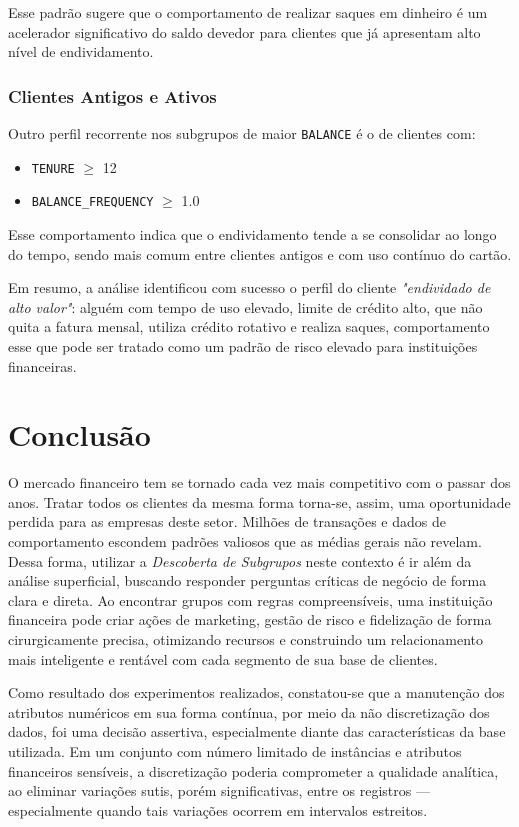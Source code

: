 \documentclass[12pt]{article}
\begin{document}
Esse padrão sugere que o comportamento de realizar saques em dinheiro é um acelerador significativo do saldo devedor para clientes que já apresentam alto nível de endividamento.

\subsubsection{Clientes Antigos e Ativos}

Outro perfil recorrente nos subgrupos de maior \texttt{BALANCE} é o de clientes com:
\begin{itemize}
    \item \texttt{TENURE} $\geq$ 12
    \item \texttt{BALANCE\_FREQUENCY} $\geq$ 1.0
\end{itemize}

Esse comportamento indica que o endividamento tende a se consolidar ao longo do tempo, sendo mais comum entre clientes antigos e com uso contínuo do cartão.

Em resumo, a análise identificou com sucesso o perfil do cliente \textit{"endividado de alto valor"}: alguém com tempo de uso elevado, limite de crédito alto, que não quita a fatura mensal, utiliza crédito rotativo e realiza saques, comportamento esse que pode ser tratado como um padrão de risco elevado para instituições financeiras.

\section{Conclusão}

O mercado financeiro tem se tornado cada vez mais competitivo com o passar dos anos. Tratar todos os clientes da mesma forma torna-se, assim, uma oportunidade perdida para as empresas deste setor. Milhões de transações e dados de comportamento escondem padrões valiosos que as médias gerais não revelam. Dessa forma, utilizar a \textit{Descoberta de Subgrupos} neste contexto é ir além da análise superficial, buscando responder perguntas críticas de negócio de forma clara e direta. Ao encontrar grupos com regras compreensíveis, uma instituição financeira pode criar ações de marketing, gestão de risco e fidelização de forma cirurgicamente precisa, otimizando recursos e construindo um relacionamento mais inteligente e rentável com cada segmento de sua base de clientes.

Como resultado dos experimentos realizados, constatou-se que a manutenção dos atributos numéricos em sua forma contínua, por meio da não discretização dos dados, foi uma decisão assertiva, especialmente diante das características da base utilizada. Em um conjunto com número limitado de instâncias e atributos financeiros sensíveis, a discretização poderia comprometer a qualidade analítica, ao eliminar variações sutis, porém significativas, entre os registros — especialmente quando tais variações ocorrem em intervalos estreitos.
\end{document}
